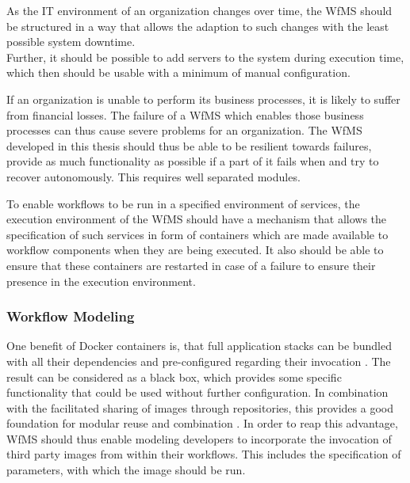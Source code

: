       As the IT environment of an organization changes over time, %
      the \ac{WfMS} should be structured in a way that allows the adaption to such changes with the least possible system downtime. \\
      Further, it should be possible to add servers to the system during execution time, which then should be usable with a minimum of manual configuration.

      If an organization is unable to perform its business processes, it is likely to suffer from financial losses. The failure of a \ac{WfMS} which enables those business processes can thus cause severe problems for an organization. The \ac{WfMS} developed in this thesis should thus be able to be resilient towards failures, \ie provide as much functionality as possible if a part of it fails when and try to recover autonomously. This requires well separated modules.

      To enable workflows to be run in a specified environment of services, the execution environment of the \ac{WfMS} should have a mechanism that allows the specification of such services in form of containers which are made available to workflow components when they are being executed. It also should be able to ensure that these containers are restarted in case of a failure to ensure their presence in the execution environment.


  \subsubsection{Workflow Modeling} %
    \label{ssub:workflow_modeling}

      One benefit of Docker containers is, that full application stacks can be bundled with all their dependencies and pre-configured regarding their invocation \cite[p.~82]{Bernstein2014Containers}. The result can be considered as a black box, which provides some specific functionality that could be used without further configuration. In combination with the facilitated sharing of images through repositories, this provides a good foundation for modular reuse and combination \cite[p.~6]{Boettiger2015Introduction}.
      In order to reap this advantage, \ac{WfMS} should thus enable modeling developers to incorporate the invocation of third party images from within their workflows. This includes the specification of parameters, with which the image should be run.

